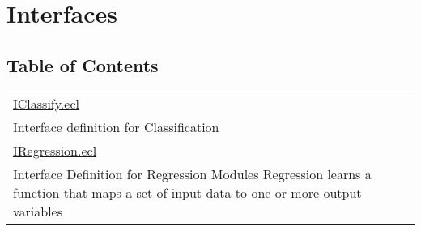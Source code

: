 \chapter*{Interfaces}
\hypertarget{ecldoc:toc:ML_Core/Interfaces}{}


\section*{Table of Contents}
{\renewcommand{\arraystretch}{1.5}
\begin{longtable}{|p{\textwidth}|}
\hline
\hyperlink{ecldoc:toc:ML_Core.Interfaces.IClassify}{IClassify.ecl} \\
Interface definition for Classification \\
\hline
\hyperlink{ecldoc:toc:ML_Core.Interfaces.IRegression}{IRegression.ecl} \\
Interface Definition for Regression Modules Regression learns a function that maps a set of input data to one or more output variables \\
\hline
\end{longtable}
}



